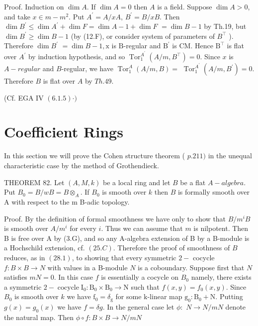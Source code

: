 Proof. Induction on $\operatorname{dim} A$. If $\operatorname{dim} A=0$ then $A$ is a field. Suppose $\operatorname{dim} A>0$, and take $x \in m-m^{2}$. Put $A^{\prime}=A / x A$, $B^{\prime}=B / x B$. Then $\operatorname{dim} B^{\prime} \leqslant \operatorname{dim} A^{\prime}+\operatorname{dim} F=\operatorname{dim} A-1+\operatorname{dim} F$ $=\operatorname{dim} B-1$ by Th.19, but $\operatorname{dim} B^{\prime} \geqslant \operatorname{dim} B-1$ (by (12.F), or consider system of parameters of $B^{\top}$ ). Therefore $\operatorname{dim} B^{\prime}$ $=\operatorname{dim} B-1, \mathrm{x}$ is $\mathrm{B}$-regular and $\mathrm{B}^{\prime}$ is $\mathrm{CM}$. Hence $\mathrm{B}^{\top}$ is flat over $A^{\prime}$ by induction hypothesis, and so $\operatorname{Tor}_{1}^{A^{\prime}}\left(A / m, B^{\top}\right)=0$. Since $x$ is $A-r e g u l a r$ and $B$-regular, we have $\operatorname{Tor}_{1}^{A}(A / m, B)=$ $\operatorname{Tor}_{1}^{A^{\prime}}\left(A / m, B^{\prime}\right)=0$. Therefore $B$ is flat over $A$ by $T h .49 .$

(Cf. EGA IV $(6.1 .5) \cdot)$

\section{Coefficient Rings}
In this section we will prove the Cohen structure theorem ( $p .211)$ in the unequal characteristic case by the method of Grothendieck.

THEOREM 82. Let $(A, M, k)$ be a local ring and let $B$ be a flat $A-a l g e b r a$. Put $B_{0}=B / w B=B \otimes_{A}$. If $B_{0}$ is smooth over $k$ then $B$ is formally smooth over A with respect to the m B-adic topology.

Proof. By the definition of formal smoothness we have only to show that $B / m^{i} B$ is smooth over $A / m^{i}$ for every $i$. Thus we can assume that $m$ is nilpotent. Then B is free over A by (3.G), and so any A-algebra extension of B by a B-module is a Hochschild extension, cf. $(25 . C)$. Therefore the proof of smoothness of $B$ reduces, as in $(28.1)$, to showing that every symmetric $2-$ cocycle $f: B \times B \rightarrow N$ with values in a B-module $N$ is a coboundary. Suppose first that $N$ satisfies $m N=0 .$ In this case $f$ is essentially a cocycle on $B_{0}$ namely, there exists a symmetric $2-\operatorname{cocycle} \mathrm{I}_{0}: \mathrm{B}_{0} \times \mathrm{B}_{0} \rightarrow \mathrm{N}$ such that $f(x, y)=f_{0}(x, y)$. Since $B_{0}$ is smooth over $k$ we have $\mathrm{f}_{0}=\delta_{\mathrm{g}}$ for some $\mathrm{k}$-linear map $\mathrm{g}_{0}: \mathrm{B}_{0}+\mathrm{N} .$ Putting $g(x)=g_{0}(x)$ we have $f=\delta g$. In the general case let $\phi:$ $N \rightarrow N / m N$ denote the natural map. Then $\phi \circ f: B \times B \rightarrow N / m N$

